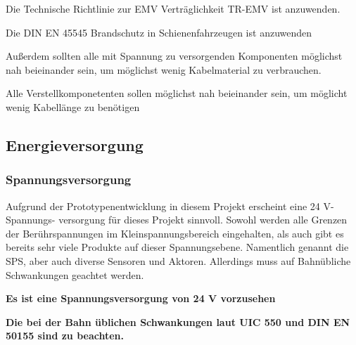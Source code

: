 \begin{feat}
Die Technische Richtlinie zur EMV Verträglichkeit TR-EMV ist anzuwenden.
\end{feat}
\begin{feat}
Die \acrshort{DIN} \acrshort{EN} 45545 Brandschutz in Schienenfahrzeugen ist anzuwenden
\end{feat}
Außerdem sollten alle mit Spannung zu versorgenden Komponenten möglichst nah beieinander sein, um möglichst wenig Kabelmaterial zu verbrauchen.
\begin{feat}
Alle Verstellkomponetenten sollen möglichst nah beieinander sein, um möglicht wenig Kabellänge zu benötigen
\end{feat}

\subsection{Energieversorgung}\label{sec:EV}
\subsubsection{Spannungsversorgung}
Aufgrund der Prototypenentwicklung in diesem Projekt erscheint eine 24 V-Spannungs- versorgung für dieses Projekt sinnvoll. Sowohl werden alle Grenzen der Berührspannungen im Kleinspannungsbereich eingehalten, als auch gibt es bereits sehr viele Produkte auf dieser Spannungsebene. Namentlich genannt die SPS, aber auch diverse Sensoren und Aktoren. Allerdings muss auf Bahnübliche Schwankungen geachtet werden.\par
\begin{feat}
\textbf{Es ist eine Spannungsversorgung von 24 V vorzusehen}
\end{feat}
\begin{rem}
\textbf{Die bei der Bahn üblichen Schwankungen laut UIC 550 und DIN EN 50155 sind zu beachten.}
\end{rem}
